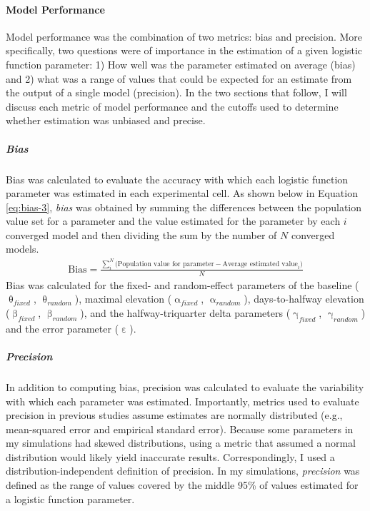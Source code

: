 \documentclass[
12pt, %
twoside,
english]{guelphthesis}
\begin{document}
\hypertarget{model-performance-2}{%
\paragraph{Model Performance}\label{model-performance-2}}

Model performance was the combination of two metrics: bias and precision. More specifically, two questions were of importance in the estimation of a given logistic function parameter: 1) How well was the parameter estimated on average (bias) and 2) what was a range of values that could be expected for an estimate from the output of a single model (precision). In the two sections that follow, I will discuss each metric of model performance and the cutoffs used to determine whether estimation was unbiased and precise.

\hypertarget{bias-1}{%
\subparagraph{Bias}\label{bias-1}}

Bias was calculated to evaluate the accuracy with which each logistic
function parameter was estimated in each experimental cell. As shown below in Equation
\eqref{eq:bias-3}, \emph{bias} was obtained by summing the differences
between the population value set for a parameter and the value estimated for the parameter by each \(i\) converged model and then dividing the sum by the number of \(N\) converged models.
\begin{align}
  \text{Bias} = \frac{\sum_i^N\text{(Population value for parameter} - \text{Average estimated value}_i)}{N}
  \label{eq:bias-3} 
\end{align}
\noindent Bias was calculated for the fixed- and random-effect parameters of the baseline (\(\uptheta_{fixed}\), \(\uptheta_{random}\)), maximal elevation (\(\upalpha_{fixed}\), \(\upalpha_{random}\)), days-to-halfway elevation (\(\upbeta_{fixed}\), \(\upbeta_{random}\)), and the halfway-triquarter delta parameters (\(\upgamma_{fixed}\), \(\upgamma_{random}\)) and the error parameter (\(\upepsilon\)).

\hypertarget{precision-1}{%
\subparagraph{Precision}\label{precision-1}}

In addition to computing bias, precision was calculated to evaluate the variability with which each parameter was estimated. Importantly, metrics used to evaluate precision in previous studies assume estimates are normally distributed (e.g., mean-squared error and empirical standard error). Because some parameters in my simulations had skewed distributions, using a metric that assumed a normal distribution would likely yield inaccurate results. Correspondingly, I used a distribution-independent definition of precision. In my simulations, \emph{precision} was defined as the range of values covered by the middle 95\% of values estimated for a logistic function parameter.
\end{document}
